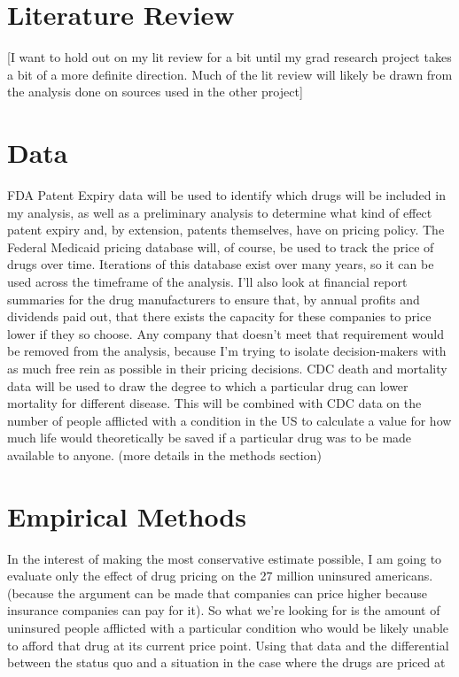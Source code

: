 \documentclass[12pt,english]{article} \usepackage{mathptmx}
\begin{document}
\section{Literature Review}\label{sec:litreview} [I want to hold out on 
my lit review for a bit until my grad research project takes a bit of a 
more definite direction. Much of the lit review will likely be drawn 
from the analysis done on sources used in the other project] 
\section{Data}\label{sec:data} FDA Patent Expiry data will be used to 
identify which drugs will be included in my analysis, as well as a 
preliminary analysis to determine what kind of effect patent expiry and, 
by extension, patents themselves, have on pricing policy. The Federal 
Medicaid pricing database will, of course, be used to track the price of 
drugs over time. Iterations of this database exist over many years, so 
it can be used across the timeframe of the analysis. I'll also look at 
financial report summaries for the drug manufacturers to ensure that, by 
annual profits and dividends paid out, that there exists the capacity 
for these companies to price lower if they so choose. Any company that 
doesn't meet that requirement would be removed from the analysis, 
because I'm trying to isolate decision-makers with as much free rein as 
possible in their pricing decisions. CDC death and mortality data will 
be used to draw the degree to which a particular drug can lower 
mortality for different disease. This will be combined with CDC data on 
the number of people afflicted with a condition in the US to calculate a 
value for how much life would theoretically be saved if a particular 
drug was to be made available to anyone. (more details in the methods 
section) \section{Empirical Methods}\label{sec:methods} In the interest 
of making the most conservative estimate possible, I am going to 
evaluate only the effect of drug pricing on the 27 million uninsured 
americans. (because the argument can be made that companies can price 
higher because insurance companies can pay for it). So what we're 
looking for is the amount of uninsured people afflicted with a 
particular condition who would be likely unable to afford that drug at 
its current price point. Using that data and the differential between 
the status quo and a situation in the case where the drugs are priced at 
\end{document}
